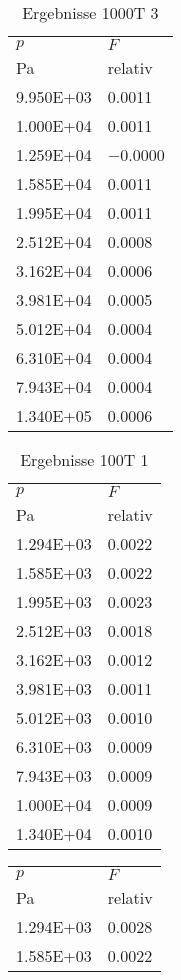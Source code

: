 \begin{table}
\begin{tabular}{l l }
$p$&$F$\\
 Pa & relativ \\\midrule
\num{9.950E+03}&\num{0.0011}\\
\num{1.000E+04}&\num{0.0011}\\
\num{1.259E+04}&\num{-0.0000}\\
\num{1.585E+04}&\num{0.0011}\\
\num{1.995E+04}&\num{0.0011}\\
\num{2.512E+04}&\num{0.0008}\\
\num{3.162E+04}&\num{0.0006}\\
\num{3.981E+04}&\num{0.0005}\\
\num{5.012E+04}&\num{0.0004}\\
\num{6.310E+04}&\num{0.0004}\\
\num{7.943E+04}&\num{0.0004}\\
\num{1.340E+05}&\num{0.0006}\\
\bottomrule
\end{tabular}\caption{Ergebnisse 1000T 3}\end{table}\begin{table}\begin{tabular}{l l }
\toprule
$p$&$F$\\
 Pa & relativ \\\midrule
\num{1.294E+03}&\num{0.0022}\\
\num{1.585E+03}&\num{0.0022}\\
\num{1.995E+03}&\num{0.0023}\\
\num{2.512E+03}&\num{0.0018}\\
\num{3.162E+03}&\num{0.0012}\\
\num{3.981E+03}&\num{0.0011}\\
\num{5.012E+03}&\num{0.0010}\\
\num{6.310E+03}&\num{0.0009}\\
\num{7.943E+03}&\num{0.0009}\\
\num{1.000E+04}&\num{0.0009}\\
\num{1.340E+04}&\num{0.0010}\\
\bottomrule
\end{tabular}\caption{Ergebnisse 100T 1}\end{table}\begin{table}\begin{tabular}{l l }
\toprule
$p$&$F$\\
 Pa & relativ \\\midrule
\num{1.294E+03}&\num{0.0028}\\
\num{1.585E+03}&\num{0.0022}\\

\end{tabular}
\end{table}
